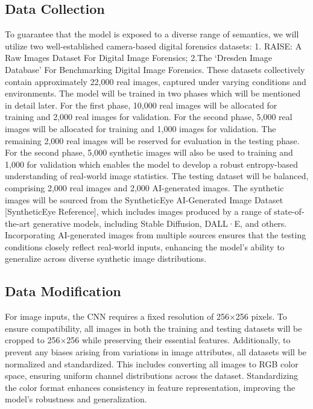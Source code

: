 \documentclass{article} %
\begin{document}
\subsection{Data Collection}
To guarantee that the model is exposed to a diverse range of semantics, we will utilize two well-established camera-based digital forensics datasets: 1. RAISE: A Raw Images Dataset For Digital Image Forensics; 2.The ‘Dresden Image Database’ For Benchmarking Digital Image Forensics. These datasets collectively contain approximately 22,000 real images, captured under varying conditions and environments. The model will be trained in two phases which will be mentioned in detail later. For the first phase, 10,000 real images will be allocated for training and 2,000 real images for validation. For the second phase, 5,000 real images will be allocated for training and 1,000 images for validation. The remaining 2,000 real images will be reserved for evaluation in the testing phase. For the second phase, 5,000 synthetic images will also be used to training and 1,000 for validation which enables the model to develop a robust entropy-based understanding of real-world image statistics.
The testing dataset will be balanced, comprising 2,000 real images and 2,000 AI-generated images. The synthetic images will be sourced from the SyntheticEye AI-Generated Image Dataset [SyntheticEye Reference], which includes images produced by a range of state-of-the-art generative models, including Stable Diffusion, DALL·E, and others. Incorporating AI-generated images from multiple sources ensures that the testing conditions closely reflect real-world inputs, enhancing the model’s ability to generalize across diverse synthetic image distributions.

\subsection{Data Modification}
For image inputs, the CNN requires a fixed resolution of 256×256 pixels. To ensure compatibility, all images in both the training and testing datasets will be cropped to 256×256 while preserving their essential features.
Additionally, to prevent any biases arising from variations in image attributes, all datasets will be normalized and standardized. This includes converting all images to RGB color space, ensuring uniform channel distributions across the dataset. Standardizing the color format enhances consistency in feature representation, improving the model's robustness and generalization.
\end{document}
